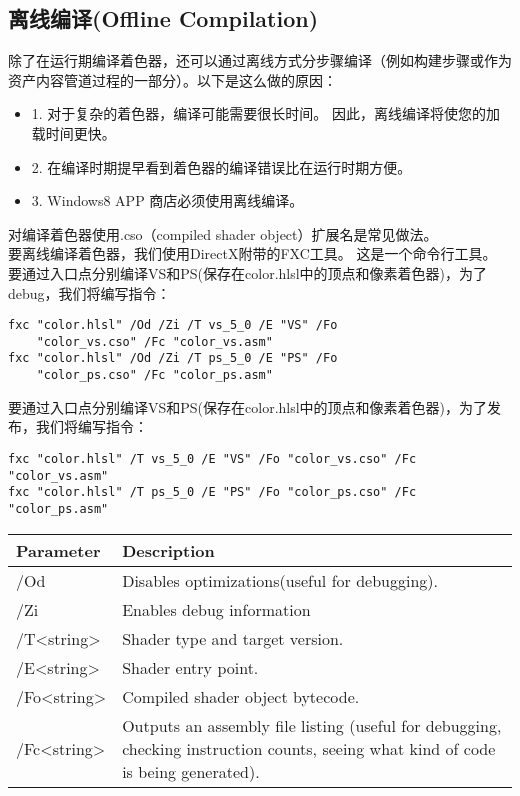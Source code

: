 \subsection{离线编译(Offline Compilation)}
\begin{flushleft}
除了在运行期编译着色器，还可以通过离线方式分步骤编译（例如构建步骤或作为资产内容管道过程的一部分）。以下是这么做的原因：\\
\begin{itemize}
    \item 1. 对于复杂的着色器，编译可能需要很长时间。 因此，离线编译将使您的加载时间更快。
    \item 2. 在编译时期提早看到着色器的编译错误比在运行时期方便。
    \item 3. Windows8 APP 商店必须使用离线编译。
\end{itemize}
对编译着色器使用.cso（compiled shader object）扩展名是常见做法。\\
要离线编译着色器，我们使用DirectX附带的FXC工具。 这是一个命令行工具。 要通过入口点分别编译VS和PS(保存在color.hlsl中的顶点和像素着色器)，为了debug，我们将编写指令：\\
\begin{lstlisting}
fxc "color.hlsl" /Od /Zi /T vs_5_0 /E "VS" /Fo 
    "color_vs.cso" /Fc "color_vs.asm"
fxc "color.hlsl" /Od /Zi /T ps_5_0 /E "PS" /Fo 
    "color_ps.cso" /Fc "color_ps.asm"
\end{lstlisting}
要通过入口点分别编译VS和PS(保存在color.hlsl中的顶点和像素着色器)，为了发布，我们将编写指令：\\
\begin{lstlisting}
fxc "color.hlsl" /T vs_5_0 /E "VS" /Fo "color_vs.cso" /Fc "color_vs.asm"
fxc "color.hlsl" /T ps_5_0 /E "PS" /Fo "color_ps.cso" /Fc "color_ps.asm"
\end{lstlisting}
\begin{tabular}{|p{5em}|p{35em}|} 
\hline
Parameter & Description\\ 
\hline
/Od & Disables optimizations(useful for debugging).\\ 
\hline
/Zi & Enables debug information\\
\hline 
/T<string> & Shader type and target version.\\
\hline 
/E<string> & Shader entry point.\\
\hline 
/Fo<string> & Compiled shader object bytecode.\\
\hline 
/Fc<string> & Outputs an assembly file listing (useful for debugging, checking instruction counts, seeing what kind of code is being generated).\\ 

\end{tabular}
\end{flushleft}
